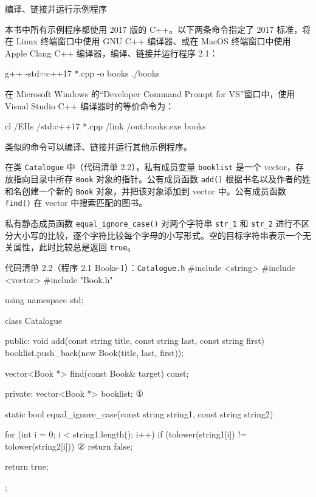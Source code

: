 \begin{mySidebar}{编译、链接并运行示例程序}

本书中所有示例程序都使用 2017 版的 C++。以下两条命令指定了 2017 标准，将在 Linux 终端窗口中使用 GNU C++ 编译器、或在 MacOS 终端窗口中使用 Apple Clang C++ 编译器，编译、链接并运行程序 2.1：

\begin{codebox}
    g++ -std=c++17 *.cpp -o books
    ./books
\end{codebox}

在 Microsoft Windows 的“Developer Command Prompt for VS”窗口中，使用 Visual Studio C++ 编译器时的等价命令为：

\begin{codebox}
    cl /EHs /std:c++17 *.cpp /link /out:books.exe
    books
\end{codebox}

类似的命令可以编译、链接并运行其他示例程序。
\end{mySidebar}

在类 \texttt{Catalogue} 中（代码清单 2.2），私有成员变量 \texttt{booklist} 是一个 vector，存放指向目录中所存 \texttt{Book} 对象的指针。公有成员函数 \texttt{add()} 根据书名以及作者的姓和名创建一个新的 \texttt{Book} 对象，并把该对象添加到 vector 中。公有成员函数 \texttt{find()} 在 vector 中搜索匹配的图书。

私有静态成员函数 \texttt{equal\_\allowbreak{}ignore\_\allowbreak{}case(\allowbreak{})\allowbreak{}} 对两个字符串 \texttt{str\_1} 和 \texttt{str\_2} 进行不区分大小写的比较，逐个字符比较每个字母的小写形式。空的目标字符串表示一个无关属性，此时比较总是返回 \texttt{true}。

\begin{codeboxt}{代码清单 2.2（程序 2.1 Books-1）：\texttt{Catalogue.\allowbreak{}h}}
#include <string>
#include <vector>
#include "Book.h"

using namespace std;

class Catalogue
{
public:
    void add(const string title,
             const string last,
             const string first)
    {
        booklist.push_back(new Book(title, last, first));
    }

    vector<Book *> find(const Book& target) const;

private:
    vector<Book *> booklist;                                ①

    static bool equal_ignore_case(const string string1,
                                  const string string2)
    {
        for (int i = 0; i < string1.length(); i++)
        {
            if (tolower(string1[i]) != tolower(string2[i])) ②
            {
                return false;
            }
        }

        return true;
    }
};
\end{codeboxt}
\par
{}\par


